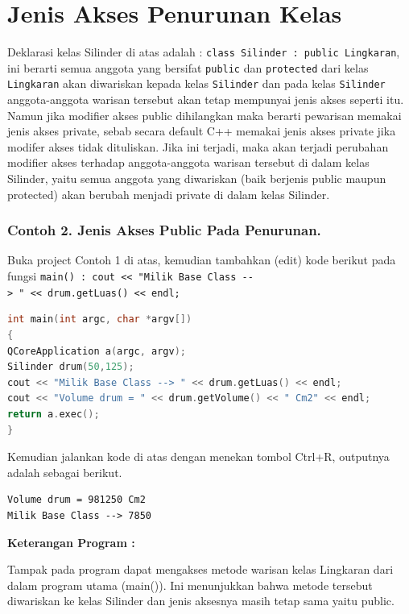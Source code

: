\section{Jenis Akses Penurunan
Kelas}\label{jenis-akses-penurunan-kelas}

Deklarasi kelas Silinder di atas adalah :
\texttt{class\ Silinder\ :\ public\ Lingkaran}, ini berarti semua
anggota yang bersifat \texttt{public} dan \texttt{protected} dari kelas
\texttt{Lingkaran} akan diwariskan kepada kelas \texttt{Silinder} dan
pada kelas \texttt{Silinder} anggota-anggota warisan tersebut akan tetap
mempunyai jenis akses seperti itu. Namun jika modifier akses public
dihilangkan maka berarti pewarisan memakai jenis akses private, sebab
secara default C++ memakai jenis akses private jika modifer akses tidak
dituliskan. Jika ini terjadi, maka akan terjadi perubahan modifier akses
terhadap anggota-anggota warisan tersebut di dalam kelas Silinder, yaitu
semua anggota yang diwariskan (baik berjenis public maupun protected)
akan berubah menjadi private di dalam kelas Silinder.

\subsubsection*{Contoh 2. Jenis Akses Public Pada Penurunan.}

Buka project Contoh 1 di atas, kemudian tambahkan (edit) kode berikut
pada fungsi
\texttt{main()\ :\ cout\ \textless{}\textless{}\ "Milik\ Base\ Class\ -\/-\textgreater{}\ "\ \textless{}\textless{}\ drum.getLuas()\ \textless{}\textless{}\ endl;}

\begin{lstlisting}[language=c++]
int main(int argc, char *argv[])
{
QCoreApplication a(argc, argv);
Silinder drum(50,125);
cout << "Milik Base Class --> " << drum.getLuas() << endl;
cout << "Volume drum = " << drum.getVolume() << " Cm2" << endl;
return a.exec();
}
\end{lstlisting}

Kemudian jalankan kode di atas dengan menekan tombol Ctrl+R, outputnya
adalah sebagai berikut.
\begin{verbatim}
Volume drum = 981250 Cm2
Milik Base Class --> 7850
\end{verbatim}


\textbf{Keterangan Program :}

Tampak pada program dapat mengakses metode warisan kelas Lingkaran dari
dalam program utama (main()). Ini menunjukkan bahwa metode tersebut
diwariskan ke kelas Silinder dan jenis aksesnya masih tetap sama yaitu
public.

